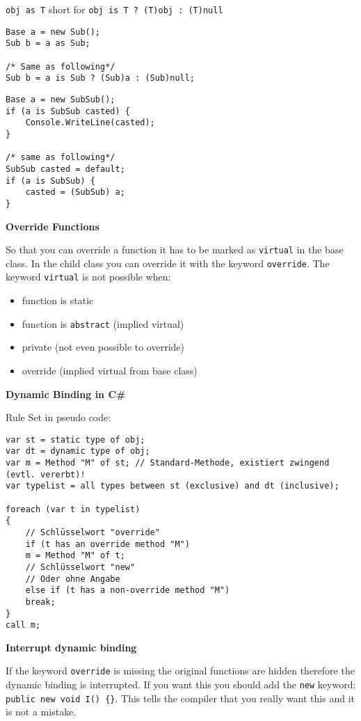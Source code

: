 \documentclass[11pt,twoside,landscape]{article}
\begin{document}
\begin{multicols}{3}
\texttt{obj as T} short for \texttt{obj is T ? (T)obj : (T)null}
\lstset{language=csharp,label= ,caption= ,captionpos=b,numbers=none}
\begin{lstlisting}
Base a = new Sub();
Sub b = a as Sub;

/* Same as following*/
Sub b = a is Sub ? (Sub)a : (Sub)null;
\end{lstlisting}

\begin{lstlisting}
Base a = new SubSub();
if (a is SubSub casted) {
    Console.WriteLine(casted);
}

/* same as following*/ 
SubSub casted = default;
if (a is SubSub) {
    casted = (SubSub) a;
}
\end{lstlisting}

\textbf{Override Functions}

So that you can override a function it has to be marked as \texttt{virtual} in the base class.
In the child class you can override it with the keyword \texttt{override}.
The keyword \texttt{virtual} is not possible when:
\begin{itemize}
\item function is static
\item function is \texttt{abstract} (implied virtual)
\item private (not even possible to override)
\item override (implied virtual from base class)
\end{itemize}


\textbf{Dynamic Binding in C\#}

Rule Set in pseudo code:
\lstset{language=csharp,label= ,caption= ,captionpos=b,numbers=none}
\begin{lstlisting}
var st = static type of obj;
var dt = dynamic type of obj;
var m = Method "M" of st; // Standard-Methode, existiert zwingend (evtl. vererbt)!
var typelist = all types between st (exclusive) and dt (inclusive);

foreach (var t in typelist)
{
    // Schlüsselwort "override"
    if (t has an override method "M")
	m = Method "M" of t;
    // Schlüsselwort "new"
    // Oder ohne Angabe
    else if (t has a non-override method "M")
	break;
}
call m;
\end{lstlisting}

\textbf{Interrupt dynamic binding}

If the keyword \texttt{override} is missing the original functions are hidden therefore the dynamic binding is interrupted.
If you want this you should add the \texttt{new} keyword: \texttt{public new void I() \{\}}.
This tells the compiler that you really want this and it is not a mistake.


\end{multicols}
\end{document}
